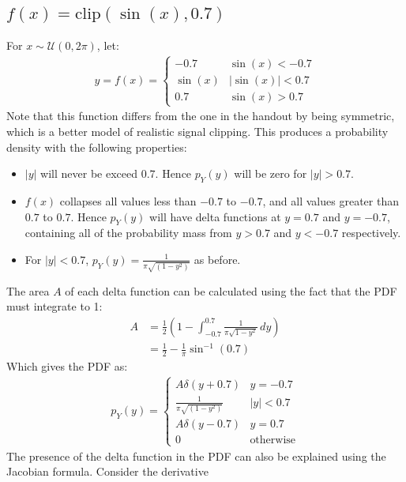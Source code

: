 \documentclass[a4paper]{article}
\begin{document}
\subsection{$f(x) = \text{clip}(\sin(x), 0.7)$}
For $x \sim \mathcal{U}(0, 2\pi)$, let:
\begin{align*}
    y = f(x) = \begin{cases}
                   -0.7 & \sin(x) < -0.7 \\
                   \sin(x) & |\sin(x)| < 0.7 \\
                   0.7 & \sin(x) > 0.7
               \end{cases}
\end{align*}
Note that this function differs from the one in the handout by being symmetric, which is a better model of realistic
signal clipping.
This produces a probability density with the following properties:
\begin{itemize}
    \item $|y|$ will never be exceed $0.7$. Hence $p_Y(y)$ will be zero for $|y| > 0.7$.
    \item $f(x)$ collapses all values less than $-0.7$ to $-0.7$, and all values greater than $0.7$ to $0.7$. Hence
          $p_Y(y)$ will have delta functions at $y = 0.7$ and $y = -0.7$, containing all of the probability mass
          from $y > 0.7$ and $y < -0.7$ respectively.
    \item For $|y| < 0.7$, $p_Y(y) = \frac{1}{\pi \sqrt{\left(1- y^2\right)}}$ as before.
\end{itemize}
The area $A$ of each delta function can be calculated using the fact that the PDF must integrate to 1:
\begin{align*}
    A &= \frac{1}{2}\left(1 - \int_{-0.7}^{0.7} \frac{1}{\pi\sqrt{1 - y^2}}\,dy \right) \\
    &= \frac{1}{2} - \frac{1}{\pi} \sin^{-1}(0.7)
\end{align*}
Which gives the PDF as:
\begin{align*}
    p_Y(y) = \begin{cases}
                 A \delta(y + 0.7) & y = -0.7 \\
                 \frac{1}{\pi \sqrt{\left(1- y^2\right)}} & |y| < 0.7 \\
                 A \delta(y - 0.7) & y = 0.7 \\
                 0 & \text{otherwise}
             \end{cases}
\end{align*}
The presence of the delta function in the PDF can also be explained using the Jacobian formula. Consider the derivative
\end{document}
